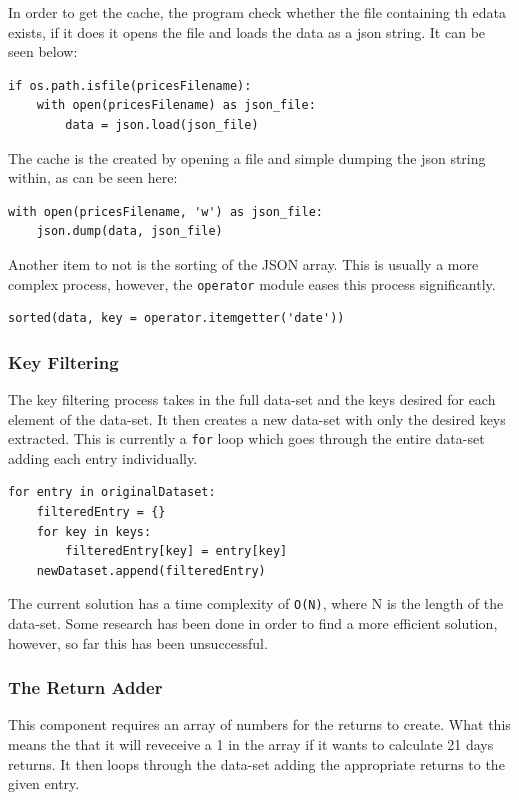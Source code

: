 In order to get the cache, the program check whether the file containing th edata exists, if it does it opens the file and loads the data as a json string. It can be seen below:
\begin{lstlisting}[caption=Loading Prices Cache]
if os.path.isfile(pricesFilename):
    with open(pricesFilename) as json_file:
        data = json.load(json_file)
\end{lstlisting}
The cache is the created by opening a file and simple dumping the json string within, as can be seen here:
\begin{lstlisting}[caption=Creation of Prices Cache]
with open(pricesFilename, 'w') as json_file:
    json.dump(data, json_file)
\end{lstlisting}

Another item to not is the sorting of the JSON array. This is usually a more complex process, however, the \verb|operator| module eases this process significantly.
\begin{lstlisting}[caption=Sort JSON Array]
sorted(data, key = operator.itemgetter('date'))
\end{lstlisting}

\subsubsection{Key Filtering}

The key filtering process takes in the full data-set and the keys desired for each element of the data-set. It then creates a new data-set with only the desired keys extracted. This is currently a \verb|for| loop which goes through the entire data-set adding each entry individually.
\begin{lstlisting}[caption=Filtering Desired Keys]
for entry in originalDataset:
    filteredEntry = {}
    for key in keys:
        filteredEntry[key] = entry[key]
    newDataset.append(filteredEntry)
\end{lstlisting}
The current solution has a time complexity of \verb|O(N)|, where N is the length of the data-set. Some research has been done in order to find a more efficient solution, however, so far this has been unsuccessful.

\subsubsection{The Return Adder}

This component requires an array of numbers for the returns to create. What this means the that it will reveceive a 1 in the array if it wants to calculate 21 days returns. It then loops through the data-set adding the appropriate returns to the given entry.

